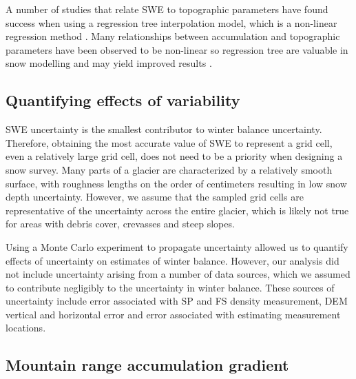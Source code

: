 \documentclass[twocolumn, letterpaper]{igs}
\begin{document}
A number of studies that relate SWE to topographic parameters have found success when using a regression tree interpolation model, which is a non-linear regression method \citep[e.g.][]{Elder1998, Erickson2005, Lopez2010}. Many relationships between accumulation and topographic parameters have been observed to be non-linear so regression tree are valuable in snow modelling and may yield improved results \citep{Erxleben2002, Molotch2005}. 

\subsection{Quantifying effects of variability}


SWE uncertainty is the smallest contributor to winter balance uncertainty. Therefore, obtaining the most accurate value of SWE to represent a grid cell, even a relatively large grid cell, does not need to be a priority when designing a snow survey. Many parts of a glacier are characterized by a relatively smooth surface, with roughness lengths on the order of centimeters \citep{Hock2005} resulting in low snow depth uncertainty. However, we assume that the sampled grid cells are representative of the uncertainty across the entire glacier, which is likely not true for areas with debris cover, crevasses and steep slopes. 

Using a Monte Carlo experiment to propagate uncertainty allowed us to quantify effects of uncertainty on estimates of winter balance. However, our analysis did not include uncertainty arising from a number of data sources, which we assumed to contribute negligibly to the uncertainty in winter balance. These sources of uncertainty include error associated with SP and FS density measurement, DEM vertical and horizontal error and error associated with estimating measurement locations.

\subsection{Mountain range accumulation gradient}
\end{document}
